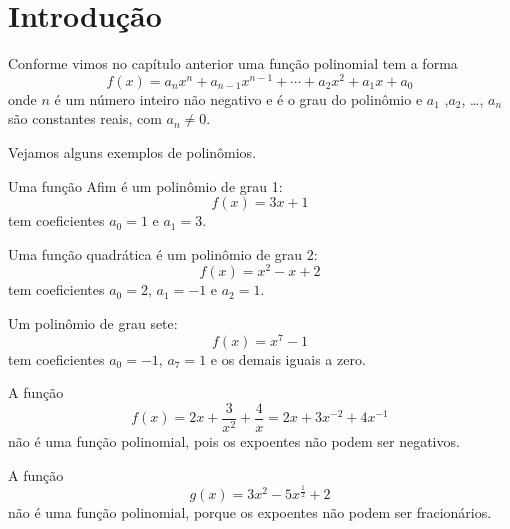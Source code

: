 \section{Introdução}

Conforme vimos no capítulo anterior uma função polinomial tem a forma
\[
  f(x) = a_nx^n + a_{n-1}x^{n-1} + \cdots + a_2x^2 + a_1x + a_0
\]
onde $n$ é um número inteiro não negativo e é o grau do polinômio e
$a_1$ ,$a_2$, \dots, $a_n$ são constantes reais, com $a_n \neq 0$.

Vejamos alguns exemplos de polinômios.

Uma função Afim é um polinômio de grau 1:
\[
  f(x) = 3x + 1
\]
tem coeficientes
$a_0=1$ e
$a_1=3$.

Uma função quadrática é um polinômio de grau 2:
\[
  f(x) = x^2 - x + 2
\]
tem coeficientes
$a_0=2$,
$a_1=-1$ e
$a_2=1$.

Um polinômio de grau sete:
\[
  f(x) = x^7 - 1
\]
tem coeficientes
$a_0=-1$,
$a_7=1$ e os demais iguais a zero.

A função
\[
  f(x)
  = 2x + \frac{3}{x^2} + \frac{4}{x}
  = 2x +3x^{-2} + 4x^{-1}
\]
não é   uma função polinomial, pois os expoentes não podem ser negativos.

A função
\[
  g(x) = 3x^2 - 5x^{\frac{1}{2}} + 2
\]
não é uma função polinomial, porque os expoentes não podem ser fracionários.

